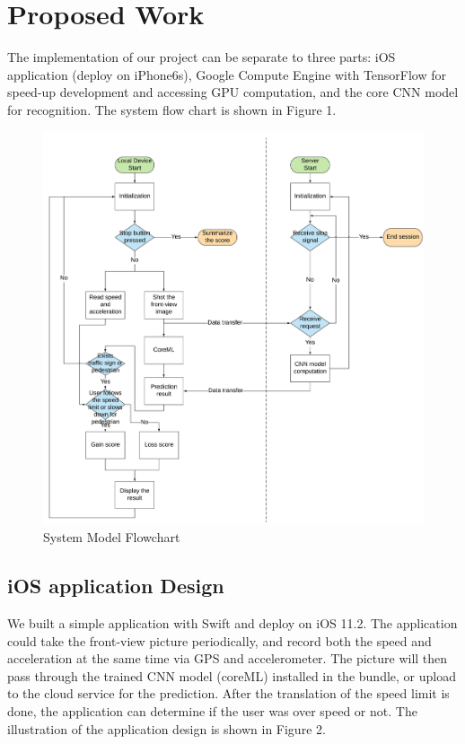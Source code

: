 \documentclass[conference]{IEEEtran}
\begin{document}
\section{Proposed Work}
The implementation of our project can be separate to three parts: iOS application (deploy on iPhone6s), Google Compute Engine with TensorFlow for speed-up development and accessing GPU computation, and the core CNN model for recognition. The system flow chart is shown in Figure 1.
\begin{figure}[t]
\centering
  \begin{minipage}{.3\textwidth}
    \centering
    \includegraphics[width=1.2\linewidth]{system_flowchart.png}
    \caption{System Model Flowchart}
    \label{fig:fig_1}
  \end{minipage}
\end{figure}
\subsection{iOS application Design}
We built a simple application with Swift and deploy on iOS 11.2. The application could take the front-view picture periodically, and record both the speed and acceleration at the same time via GPS and accelerometer. The picture will then pass through the trained CNN model (coreML) installed in the bundle, or upload to the cloud service for the prediction. After the translation of the speed limit is done, the application can determine if the user was over speed or not. The illustration of the application design is shown in Figure 2.
\end{document}
